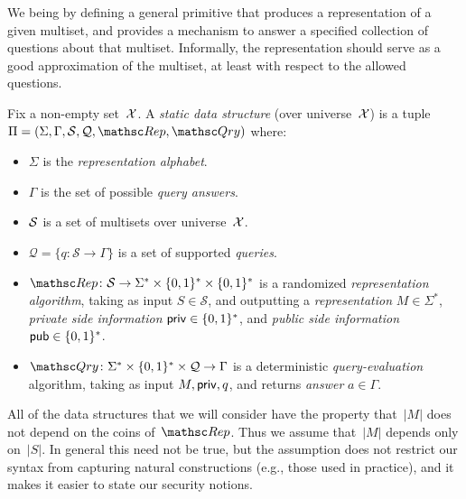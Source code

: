   We being by defining a general primitive
that produces a representation of a given multiset, and provides a
mechanism to answer a specified collection of questions about that
multiset.  Informally, the representation should serve as a good
approximation of the multiset, at least with respect to the allowed
questions.
\begin{definition} \rm
Fix a non-empty set~${\cal X}$. A \emph{static data structure} (over universe~${\cal X}$)
is a tuple $\setprim=(\Sigma,\Gamma,\calS,\calQ,\Rep, \Qry)$ where:
\begin{itemize}
\item $\Sigma$ is the \emph{representation alphabet}. 
\item $\Gamma$ is the set of possible \emph{query answers}.
\item ${\cal S}$ is a set  of multisets over universe~${\cal X}$.
\item $\mathcal{Q}=\{q \colon \mathcal{S} \to \Gamma\}$ is a set
    of supported \emph{queries}.
\item $\Rep \colon \mathcal{S} \to \Sigma^* \times \bits^*
    \times \bits^*$ is a randomized \emph{representation
    algorithm}, taking as input $S \in \mathcal{S}$, and
    outputting a \emph{representation} $M \in \Sigma^*$,
    \emph{private side information} ${\sf priv} \in \{0,1\}^*$, and
    \emph{public side information} ${\sf pub} \in \{0,1\}^*$.
\item $\Qry\colon \Sigma^* \times \bits^* \times \calQ \to
    \Gamma$ is a deterministic \emph{query-evaluation}
    algorithm, taking as input $M, {\sf priv}, q$, and returns
    \emph{answer} $a \in \Gamma$. 
\end{itemize}
\hfill\dqed
\end{definition}
 All of the data structures that
we will consider have the property that~$|M|$ does not depend on the
coins of~$\Rep$. Thus we assume that~$|M|$ depends only on~$|S|$. In
general this need not be true, but the assumption does not restrict
our syntax from capturing natural constructions (e.g., those used in
practice), and it makes it easier to state our security notions.

